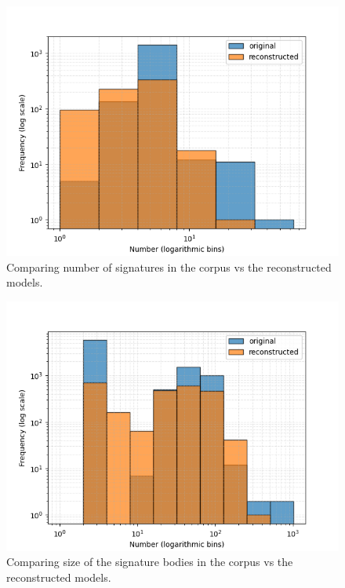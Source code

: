 \begin{figure}[htbp]
\centerline{\includegraphics[width=\linewidth]{"./Comparing number of signatures in the corpus vs the reconstructed models.png"}}
\caption{Comparing number of signatures in the corpus vs the reconstructed models.}
\label{fig}
\end{figure}


\begin{figure}[htbp]
\centerline{\includegraphics[width=\linewidth]{"./Comparing size of the signature bodies in the corpus vs the reconstructed models.png"}}
\caption{Comparing size of the signature bodies in the corpus vs the reconstructed models.}
\label{fig}
\end{figure}


